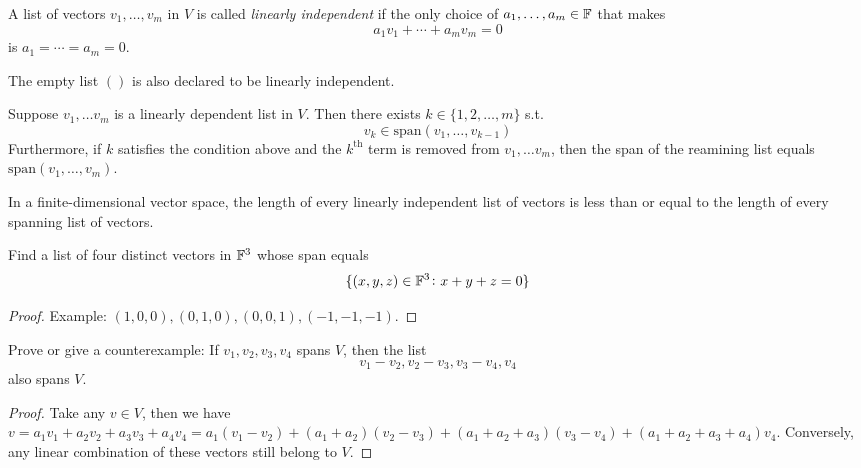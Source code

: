 \documentclass{extarticle}
\begin{document}
\begin{definition}
    A list of vectors \(v_1, \ldots, v_m\) in \(V\) is called \emph{linearly independent}
    if the only choice of \(a_1, \ldots, a_m \in \mathbb{F}\) that makes 
    \[a_1v_1 + \cdots + a_m v_m = 0\]
    is \(a_1 = \cdots = a_m = 0\). 

    The empty list \(()\) is also declared to be linearly independent.
\end{definition}

\begin{lemma}
    Suppose \(v_1, \ldots v_m\) is a linearly dependent list in \(V\). Then 
    there exists \(k \in \{1, 2, \ldots, m\}\) s.t. 
    \[v_k \in \text{span}(v_1, \ldots, v_{k-1})\]
    Furthermore, if \(k\) satisfies the condition above and the \(k^{\text{th}}\)
    term is removed from \(v_1, \ldots v_m\), then the span of the reamining list 
    equals \(\text{span}(v_1, \ldots, v_m)\).
\end{lemma}

\begin{lemma}
    In a finite-dimensional vector space, the length of every linearly independent 
    list of vectors is less than or equal to the length of every spanning 
    list of vectors. 
\end{lemma}

\newpage 
{}
\begin{problem}{1}
    Find a list of four distinct vectors in \(\mathbb{F}^3\) whose span equals 
    \[\{(x, y, z) \in \mathbb{F}^3 \colon x + y + z =0\}\]
\end{problem}

\begin{proof}
Example: \((1, 0, 0), (0, 1, 0), (0, 0, 1), (-1, -1, -1)\). 
\end{proof}

\begin{problem}{2}
    Prove or give a counterexample: If \(v_1, v_2, v_3, v_4\) spans \(V\), then 
    the list 
    \[v_1 - v_2, v_2 - v_3, v_3 - v_4, v_4\]
    also spans \(V\).
\end{problem}

\begin{proof}
Take any \(v \in V\), then we have \(v = a_1 v_1 + a_2 v_2 + a_3 v_3 
+ a_4 v_4 = a_1(v_1 - v_2) + (a_1 + a_2) (v_2 - v_3) + (a_1 + a_2 + a_3)(
    v_3 - v_4) + (a_1 + a_2 +a_3 + a_4) v_4\). Conversely, any linear combination 
    of these vectors still belong to \(V\).
\end{proof}
\end{document}
